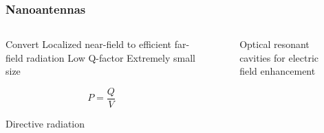 \documentclass[10pt]{beamer}
\begin{document}
\begin{frame}
    \frametitle{Nanoantennas}

    \begin{columns} %
        \begin{column}{.4\textwidth}
            \vspace*{-1cm}
            \begin{outline}[itemize]
                \1 Convert Localized near-field to efficient far-field radiation
                \1 Low Q-factor
                \1 Extremely small size
                \1 \color{red}{High Purcell Factor}
            \end{outline}
            \begin{equation} \nonumber
                {P}  = \frac{{Q}}{{V}}
            \end{equation}
            \begin{outline}[itemize]
                \1 Directive radiation
            \end{outline}
        \end{column}
        \begin{column}{.55\textwidth}
            \begin{figure}
                \centering
                \fontsize{6}{7}\selectfont
                \def\svgwidth{1.0\linewidth}
                
                \caption{Optical resonant cavities for electric field enhancement}
            \end{figure}
        \end{column}%
    \end{columns}
\end{frame}
\end{document}
